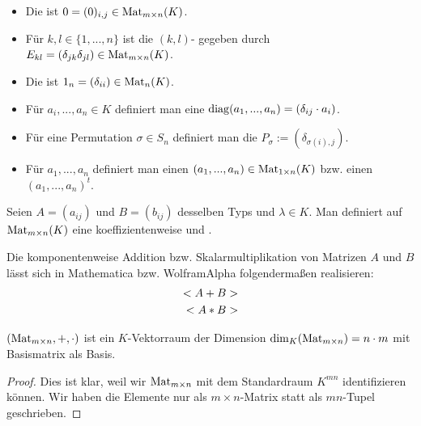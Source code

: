 \begin{example}
	\begin{itemize}
		\item Die  ist $0=(0)_{i,j} \in \Mat_{m\times n}(K)$.
		\item Für $k,l \in \{1,...,n\}$ ist die $(k,l)$- gegeben durch $E_{kl}=(\delta_{jk}\delta_{jl})\in 
		\Mat_{m\times n}(K)$.
		\item Die  ist $1_n=(\delta_{ii})\in \Mat_n(K)$.
		\item Für $a_i,...,a_n \in K$ definiert man eine  $\diag(a_1,...,a_n)=(\delta_{ij}\cdot a_i)$.
		\item Für eine Permutation $\sigma\in S_n$ definiert man die  $P_\sigma := (\delta_{\sigma
			(i),j})$.
		\item Für $a_1,...,a_n$ definiert man einen  $(a_1,...,a_n)\in \Mat_{1\times n}(K)$ bzw. einen 
		 $(a_1,...,a_n)^t$.
	\end{itemize}
\end{example}

\begin{definition}
	Seien $A=(a_{ij})$ und $B=(b_{ij})$ desselben Typs und 
	$\lambda \in K$. Man definiert auf $\Mat_{m\times n}(K)$ eine koeffizientenweise  und .
\end{definition}

\begin{mathematica}[Matrizenoperationen]
	Die komponentenweise Addition bzw. Skalarmultiplikation von Matrizen $A$ und $B$ lässt sich in Mathematica bzw. WolframAlpha folgendermaßen realisieren:
	\begin{align}
		\texttt{A+B}\notag \\
		\texttt{A*B}\notag
	\end{align}
\end{mathematica}

\begin{proposition}
	$(\Mat_{m\times n},+,\cdot)$ ist ein $K$-Vektorraum der Dimension $\dim_K(\Mat_{m\times n})=n\cdot m$ mit 
	Basismatrix als Basis.
\end{proposition}
\begin{proof}
	Dies ist klar, weil wir $\Mat_{m\times n}$ mit dem Standardraum $K^{mn}$ identifizieren können. Wir haben die 
	Elemente nur als $m\times n$-Matrix statt als $mn$-Tupel geschrieben.
\end{proof}

